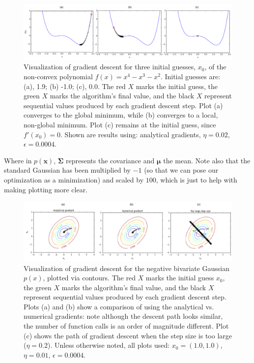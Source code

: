 \documentclass{article}
\begin{document}
\begin{figure}[!ht]
\centering
\includegraphics[scale=0.9]{polynomialdescent.pdf}
\caption{Visualization of gradient descent for three initial guesses, $x_0$, of the non-convex polynomial $f(x) = x^4 - x^3 -x^2$.  Initial guesses are: (a), 1.9; (b) -1.0; (c), 0.0.  The red $X$ marks the initial guess, the green $X$ marks the algorithm's final value, and the black $X$ represent sequential values produced by each gradient descent step. Plot (a) converges to the global minimum, while (b) converges to a local, non-global minimum.  Plot (c) remains at the initial guess, since $f'(x_0)=0$. Shown are results using: analytical gradients, $\eta = 0.02$, $\epsilon = 0.0004$.}
\label{poly}
\end{figure}

Where in $p(\mathbf{x})$, $\mathbf{\Sigma}$ represents the covariance and $\boldsymbol{\mu}$ the mean.  Note also that the standard Gaussian has been multiplied by $-1$ (so that we can pose our optimization as a minimization) and scaled by $100$, which is just to help with making plotting more clear.

\begin{figure}[!ht]
\centering
\includegraphics[scale=0.9]{negGaussianDescent.pdf}
\caption{Visualization of gradient descent for the negative bivariate Gaussian $p(x)$, plotted via contours.  The red $X$ marks the initial guess $x_0$, the green $X$ marks the algorithm's final value, and the black $X$ represent sequential values produced by each gradient descent step.  Plots (a) and (b) show a comparison of using the analytical vs. numerical gradients: note although the descent path looks similar, the number of function calls is an order of magnitude different.   Plot (c) shows the path of gradient descent when the step size is too large ($\eta = 0.2$). Unless otherwise noted, all plots used: $x_0 = (1.0,1.0)$, $\eta = 0.01$, $\epsilon = 0.0004$.}
\label{gauss}
\end{figure}
\end{document}
